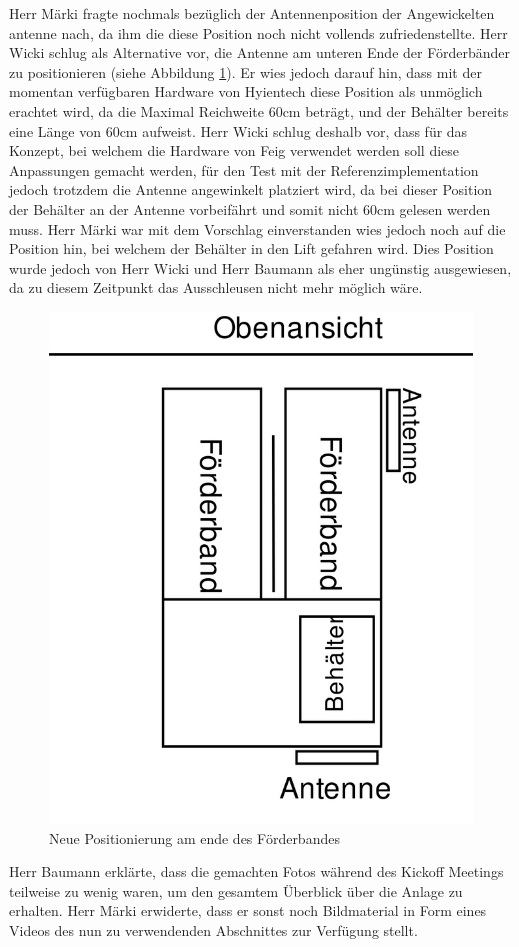 \documentclass[parskip=full, a4paper]{scrreprt}
\begin{document}
Herr Märki fragte nochmals bezüglich der Antennenposition der Angewickelten antenne nach, da ihm die diese Position noch nicht vollends zufriedenstellte. Herr Wicki schlug als Alternative vor, die Antenne am unteren Ende der Förderbänder zu positionieren (siehe Abbildung \ref{fig:neueAntennenposition}). Er wies jedoch darauf hin, dass mit der momentan verfügbaren Hardware von Hyientech diese Position als unmöglich erachtet wird, da die Maximal Reichweite 60cm beträgt, und der Behälter bereits eine Länge von 60cm aufweist. Herr Wicki schlug deshalb vor, dass für das Konzept, bei welchem die Hardware von Feig verwendet werden soll diese Anpassungen gemacht werden, für den Test mit der Referenzimplementation jedoch trotzdem die Antenne angewinkelt platziert wird, da bei dieser Position der Behälter an der Antenne vorbeifährt und somit nicht 60cm gelesen werden muss. Herr Märki war mit dem Vorschlag einverstanden wies jedoch noch auf die Position hin, bei welchem der Behälter in den Lift gefahren wird. Dies Position wurde jedoch von Herr Wicki und Herr Baumann als eher ungünstig ausgewiesen, da zu diesem Zeitpunkt das Ausschleusen nicht mehr möglich wäre.
\begin{figure}[htb]
	\centering
	\includegraphics[keepaspectratio,width=.6\linewidth]{img/AntennenPositionNeu}
	\caption{Neue Positionierung am ende des Förderbandes}
	\label{fig:neueAntennenposition}
\end{figure}

Herr Baumann erklärte, dass die gemachten Fotos während des Kickoff Meetings teilweise zu wenig waren, um den gesamtem Überblick über die Anlage zu erhalten. Herr Märki erwiderte, dass er sonst noch Bildmaterial in Form eines Videos des nun zu verwendenden Abschnittes zur Verfügung stellt.
\end{document}
